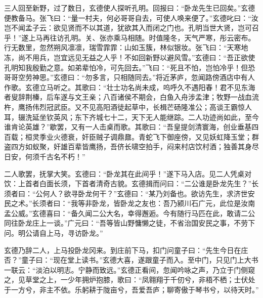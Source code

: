 三人回至新野，过了数日，玄德使人探听孔明。回报曰：“卧龙先生已回矣。”玄德便教备马。张飞曰：“量一村夫，何必哥哥自去，可使人唤来便了。”玄德叱曰：“汝岂不闻孟子云：欲见贤而不以其道，犹欲其入而闭之门也。孔明当世大贤，岂可召乎！”遂上马再往访孔明。关、张亦乘马相随。时值隆冬，天气严寒，彤云密布。行无数里，忽然朔风凛凛，瑞雪霏霏：山如玉簇，林似银妆。张飞曰：“天寒地冻，尚不用兵，岂宜远见无益之人乎！不如回新野以避风雪。”玄德曰：“吾正欲使孔明知我殷勤之意。如弟辈怕冷，可先回去。”飞曰：“死且不怕，岂怕冷乎！但恐哥哥空劳神思。”玄德曰：“勿多言，只相随同去。”将近茅庐，忽闻路傍酒店中有人作歌。玄德立马听之。其歌曰：“壮士功名尚未成，呜呼久不遇阳春！君不见东海者叟辞荆榛，后车遂与文王亲；八百诸侯不期会，白鱼入舟涉孟津；牧野一战血流杵，鹰扬伟烈冠武臣。又不见高阳酒徒起草中，长楫芒砀隆准公；高谈王霸惊人耳，辍洗延坐钦英风；东下齐城七十二，天下无人能继踪。二人功迹尚如此，至今谁肯论英雄？”歇罢，又有一人击桌而歌。其歌曰：“吾皇提剑清寰海，创业垂基四百载；桓灵季业火德衰，奸臣贼子调鼎鼐。青蛇飞下御座傍，又见妖虹降玉堂；群盗四方如蚁聚，奸雄百辈皆鹰扬，吾侪长啸空拍手，闷来村店饮村酒；独善其身尽日安，何须千古名不朽！”

二人歌罢，抚掌大笑。玄德曰：“卧龙其在此间乎！”遂下马入店。见二人凭桌对饮：上首者白面长须，下首者清奇古貌。玄德揖而问曰：“二公谁是卧龙先生？”长须者曰：“公何人？欲寻卧龙何干？”玄德曰：“某乃刘备也。欲访先生，求济世安民之术。”长须者曰：“我等非卧龙，皆卧龙之友也：吾乃颍川石广元，此位是汝南孟公威。”玄德喜曰：“备久闻二公大名，幸得邂逅。今有随行马匹在此，敢请二公同往卧龙庄上一谈。”广元曰：“吾等皆山野慵懒之徒，不省治国安民之事，不劳下问。明公请自上马，寻访卧龙。”

玄德乃辞二人，上马投卧龙冈来。到庄前下马，扣门问童子曰：“先生今日在庄否？”童子曰：“现在堂上读书。”玄德大喜，遂跟童子而入。至中门，只见门上大书一联云：“淡泊以明志。宁静而致远。”玄德正看间，忽闻吟咏之声，乃立于门侧窥之，见草堂之上，一少年拥炉抱膝，歌曰：“凤翱翔于千仞兮，非梧不栖；士伏处于一方兮，非主不依。乐躬耕于陇亩兮，吾爱吾庐；聊寄傲于琴书兮，以待天时。”

